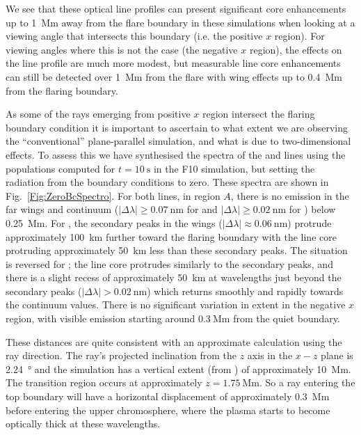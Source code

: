 We see that these optical line profiles can present significant core enhancements up to \SI{1}{\mega\metre} away from the flare boundary in these simulations when looking at a viewing angle that intersects this boundary (i.e. the positive $x$ region).
For viewing angles where this is not the case (the negative $x$ region), the effects on the line profile are much more modest, but measurable line core enhancements can still be detected over \SI{1}{\mega\metre} from the flare with wing effects up to \SI{0.4}{\mega\metre} from the flaring boundary.

As some of the rays emerging from positive $x$ region intersect the flaring boundary condition it is important to ascertain to what extent we are observing the ``conventional'' plane-parallel simulation, and what is due to two-dimensional effects.
To assess this we have synthesised the spectra of the \Ha{} and \CaLine{} lines using the populations computed for $t=\SI{10}{\second}$ in the F10 simulation, but setting the radiation from the boundary conditions to zero.
These spectra are shown in Fig.~\ref{Fig:ZeroBcSpectro}.
For both lines, in region $A$, there is no emission in the far wings and continuum ($|\Delta\lambda|\ge\SI{0.07}{\nano\metre}$ for \Ha{} and $|\Delta\lambda|\ge\SI{0.02}{\nano\metre}$ for \CaLine{}) below \SI{0.25}{\mega\metre}.
For \Ha{}, the secondary peaks in the wings ($|\Delta\lambda|\approx\SI{0.06}{\nano\metre}$) protrude approximately \SI{100}{\kilo\metre} further toward the flaring boundary with the line core protruding approximately \SI{50}{\kilo\metre} less than these secondary peaks.
The situation is reversed for \CaLine{}; the line core protrudes similarly to the secondary \Ha{} peaks, and there is a slight recess of approximately \SI{50}{\kilo\metre} at wavelengths just beyond the secondary peaks ($|\Delta\lambda| > \SI{0.02}{\nano\metre}$) which returns smoothly and rapidly towards the continuum values.
There is no significant variation in extent in the negative $x$ region, with visible emission starting around $\SI{0.3}{\mega\metre}$ from the quiet boundary.

These distances are quite consistent with an approximate calculation using the ray direction.
The ray's projected inclination from the $z$ axis in the $x-z$ plane is \SI{2.24}{\degree} and the simulation has a vertical extent (from \Radyn{}) of approximately \SI{10}{\mega\metre}.
The transition region occurs at approximately $z=\SI{1.75}{\mega\metre}$.
So a ray entering the top boundary will have a horizontal displacement of approximately \SI{0.3}{\mega\metre} before entering the upper chromosphere, where the plasma starts to become optically thick at these wavelengths.

